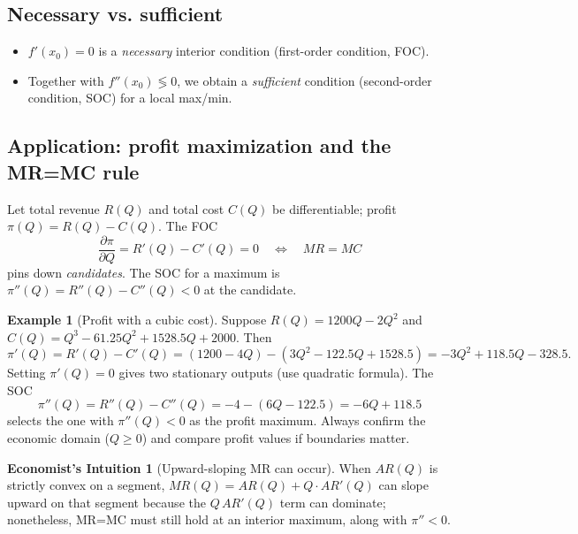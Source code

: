 \documentclass[12pt]{article}
\newcommand{\pd}[2]{\frac{\partial #1}{\partial #2}}
\theoremstyle{definition}
\newtheorem{example}{Example}
\newtheorem{remark}{Economist's Intuition}
\begin{document}
\subsection*{Necessary vs. sufficient}
\begin{itemize}[leftmargin=1.5em]
\item $f'(x_0)=0$ is a \emph{necessary} interior condition (first-order condition, FOC).
\item Together with $f''(x_0)\lessgtr 0$, we obtain a \emph{sufficient} condition (second-order condition, SOC) for a local max/min.
\end{itemize}

\subsection*{Application: profit maximization and the MR=MC rule}
Let total revenue $R(Q)$ and total cost $C(Q)$ be differentiable; profit $\pi(Q)=R(Q)-C(Q)$. The FOC
\[
\pd{\pi}{Q}=R'(Q)-C'(Q)=0 \quad\Longleftrightarrow\quad MR=MC
\]
pins down \emph{candidates}. The SOC for a maximum is $\pi''(Q)=R''(Q)-C''(Q)<0$ at the candidate. 

\begin{example}[Profit with a cubic cost]
Suppose $R(Q)=1200Q-2Q^2$ and $C(Q)=Q^3-61.25Q^2+1528.5Q+2000$. Then
\[
\pi'(Q)=R'(Q)-C'(Q)=(1200-4Q)-(3Q^2-122.5Q+1528.5)= -3Q^2+118.5Q-328.5.
\]
Setting $\pi'(Q)=0$ gives two stationary outputs (use quadratic formula). The SOC
\[
\pi''(Q)=R''(Q)-C''(Q)=-4-(6Q-122.5)=-6Q+118.5
\]
selects the one with $\pi''(Q)<0$ as the profit maximum. Always confirm the economic domain ($Q\ge0$) and compare profit values if boundaries matter.
\end{example}

\begin{remark}[Upward-sloping MR can occur]
When $AR(Q)$ is strictly convex on a segment, $MR(Q)=AR(Q)+Q\cdot AR'(Q)$ can slope upward on that segment because the $Q\,AR'(Q)$ term can dominate; nonetheless, MR=MC must still hold at an interior maximum, along with $\pi''<0$.
\end{remark}
\end{document}
